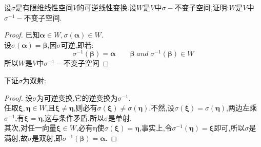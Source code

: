 \documentclass[lang=cn,11pt,normal]{elegantbook}
\begin{document}
	\begin{exercise}
		设$\sigma$是有限维线性空间$V$的可逆线性变换.设$W$是$V$中$\sigma-$不变子空间,证明:$W$是$V$中$\sigma^{-1}-$不变子空间.
	\end{exercise}
	\begin{proof}
		已知$\boldsymbol{\alpha}\in W,\sigma(\boldsymbol{\alpha})\in W$.\\
		设$\sigma(\boldsymbol{\alpha})=\boldsymbol{\beta}$,因$\sigma$可逆,即若:
		\begin{equation}
		\sigma^{-1}(\boldsymbol{\beta})=\boldsymbol{\alpha}\qquad\boldsymbol{\beta}\;and\;\sigma^{-1}(\boldsymbol{\beta})\in W
		\end{equation}
		所以$W$是$V$中$\sigma^{-1}-$不变子空间
	\end{proof}
	下证$\sigma$为双射:
	\begin{proof}
		设$\sigma$为可逆变换,它的逆变换为$\sigma^{-1}$.\\
		任取$\boldsymbol{\xi},\boldsymbol{\eta}\in W$,且$\boldsymbol{\xi}\ne\boldsymbol{\eta}$,则必有$\sigma(\boldsymbol{\xi})\ne\sigma(\boldsymbol{\eta})$.不然,设$\sigma(\boldsymbol{\xi})=\sigma(\boldsymbol{\eta})$,两边左乘$\sigma^{-1}$,有$\boldsymbol{\xi}=\boldsymbol{\eta}$,这与条件矛盾,所以$\sigma$是单射.\\
		其次,对任一向量$\boldsymbol{\xi}\in W$,必有$\boldsymbol{\eta}$使$\sigma(\boldsymbol{\xi})=\boldsymbol{\eta}$,事实上,令$\sigma^{-1}(\boldsymbol{\eta})=\boldsymbol{\xi}$即可,所以$\sigma$是满射,故$\sigma$是双射,即$\sigma^{-1}(\boldsymbol{\beta})=\boldsymbol{\alpha}$.
	\end{proof}
\end{document}
